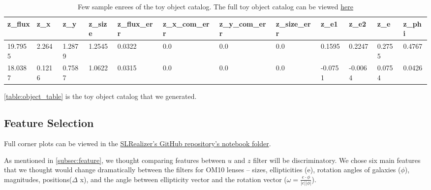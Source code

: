 \documentclass[\docopts]{\docclass}
\begin{document}
\begin{table}[!h]
\begin{tabular}{|l|l|l|l|l|l|l|l|l|l|l|l|}
\hline
z\_flux & z\_x   & z\_y   & z\_size & z\_flux\_err & z\_x\_com\_err & z\_y\_com\_err & z\_size\_err & z\_e1   & z\_e2   & z\_e   & z\_phi \\ \hline
19.7955 & 2.264  & 1.2879 & 1.2545  & 0.0322       & 0.0            & 0.0            & 0.0          & 0.1595  & 0.2247  & 0.2755 & 0.4767 \\
18.0387 & 0.1216 & 0.7587 & 1.0622  & 0.0315       & 0.0            & 0.0            & 0.0          & -0.0751 & -0.0064 & 0.0754 & 0.0426 \\ \hline
\end{tabular}

\caption{Few sample enrees of the toy object catalog. The full toy
object catalog can be viewed
\href{https://www.dropbox.com/s/ob51rxjexzuervl/toy_object_catalog.csv?dl=0}{here}}
\label{table:object_table} \end{table}

\autoref{table:object_table} is the toy object catalog that we
generated.

\subsection{Feature Selection}
\label{subsec:feature_data}

Full corner plots can be viewed in the
\href{https://github.com/jennykim1016/SLRealizer/blob/master/notebooks/SDSSvsOM10.ipynb}{SLRealizer's
GitHub repository's notebook folder}.

As mentioned in \autoref{subsec:feature}, we thought comparing features
between $u$ and $z$ filter will be discriminatory. We chose six main
features that we thought would change dramatically between the filters
for OM10 lenses -- sizes, ellipticities (e), rotation angles of galaxies
($\phi$), magnitudes, positions($\Delta$ x), and the angle between
ellipticity vector and the rotation vector ($\omega = \frac{e \cdot
\phi}{ \left | e \right | \left | \phi \right |}$).
\end{document}
